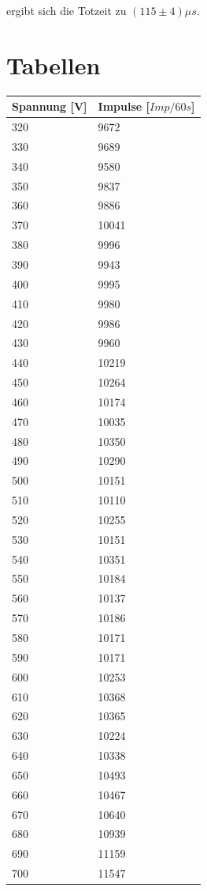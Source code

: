 \documentclass[captions=tableheading]{scrartcl}
\begin{document}
\noindent ergibt  sich die Totzeit zu $(115 \pm 4)\mu s$.

\section{Tabellen}
\begin{minipage}{\linewidth}
    \begin{table}[H]
        \centering
    
    \begin{tabular}{ll}
        \toprule
        Spannung [V] & Impulse [$Imp/60s$]\\
        \midrule
        320 &	9672   \\   
        330 &	9689   \\  
        340 &	9580   \\   
        350 &	9837   \\   
        360 &	9886   \\    
        370 &	10041  \\    
        380 &	9996   \\   
        390 &	9943   \\   
        400 &	9995   \\   
        410 &	9980   \\    
        420 &	9986   \\   
        430 &	9960   \\  
        440 &	10219  \\
        450 &	10264  \\
        460 &	10174  \\
        470 &	10035  \\
        480 &	10350  \\
        490 &	10290  \\
        500 &	10151  \\
        510 &	10110  \\
        520 &	10255  \\
        530 &	10151  \\
        540 &	10351  \\
        550 &	10184  \\
        560 &	10137  \\
        570 &	10186  \\
        580 &	10171  \\
        590 &	10171  \\
        600 &	10253  \\
        610 &	10368  \\
        620 &	10365  \\
        630 &	10224  \\
        640 &	10338  \\
        650 &	10493  \\
        660 &	10467  \\
        670 &	10640  \\
        680 &	10939  \\
        690 &	11159  \\
        700 &	11547  \\      
        \bottomrule
        

\end{tabular}
\end{table}
\end{minipage}
\end{document}
